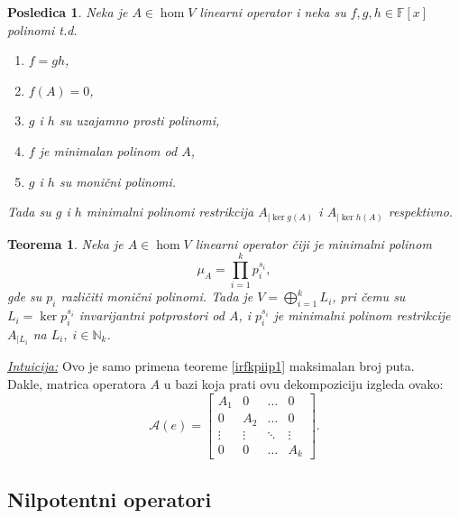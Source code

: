 \documentclass[a4paper,12pt,twoside]{report}
\newtheorem{theorem}{Teorema}[section]
\newtheorem{corollary}{Posledica}[theorem]
\numberwithin{algorithm}{section}
\begin{document}
\newpage

\begin{corollary}
    Neka je $A \in \hom V$ linearni operator i neka su $f, g, h \in \mathbb{F}[x]$ polinomi t.d.
    \begin{enumerate}
        \item $f = gh$,
        \item $f(A) = 0$,
        \item $g$ i $h$ su uzajamno prosti polinomi,
        \item $f$ je minimalan polinom od $A$,
        \item $g$ i $h$ su monični polinomi.
    \end{enumerate}
    Tada su $g$ i $h$ minimalni polinomi restrikcija $A_{|\ker g(A)}$ i $A_{| \ker h(A)}$ respektivno.
\end{corollary}

\begin{theorem}
    Neka je $A \in \hom V$ linearni operator čiji je minimalni polinom
    \[ \mu_A = \prod_{i=1}^{k}p_i^{s_i}, \]
    gde su $p_i$ različiti monični polinomi. Tada je $V = \bigoplus_{i=1}^k L_i$, pri čemu su $L_i = \ker p_i^{s_i}$ invarijantni potprostori od $A$, 
    i $p_i^{s_i}$ je minimalni polinom restrikcije $A_{|L_i}$ na $L_i, \; i \in \mathbb{N}_k$.
\end{theorem}
\noindent\underline{\textit{Intuicija:}} Ovo je samo primena teoreme \ref{irfkpiip1} maksimalan broj puta. \\
Dakle, matrica operatora $A$ u bazi koja prati ovu dekompoziciju izgleda ovako:
\[ \mathcal{A}(e) = \begin{bmatrix}
    A_1 & 0 & \dots & 0 \\
    0 & A_2 & \dots & 0 \\
    \vdots & \vdots & \ddots & \vdots \\
    0 & 0 & \dots & A_k
\end{bmatrix}. \]

\subsection{Nilpotentni operatori}
\end{document}
